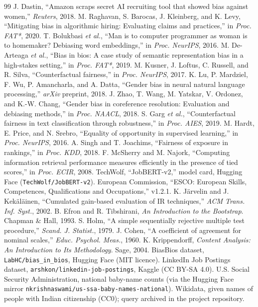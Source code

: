 \documentclass[conference,a4paper]{IEEEtran}
\begin{document}
\begin{thebibliography}{99}
 J. Dastin, ``Amazon scraps secret AI recruiting tool that showed bias against women,'' \emph{Reuters}, 2018.
 M. Raghavan, S. Barocas, J. Kleinberg, and K. Levy, ``Mitigating bias in algorithmic hiring: Evaluating claims and practices,'' in \emph{Proc. FAT*}, 2020.
 T. Bolukbasi \emph{et al.}, ``Man is to computer programmer as woman is to homemaker? Debiasing word embeddings,'' in \emph{Proc. NeurIPS}, 2016.
 M. De-Arteaga \emph{et al.}, ``Bias in bios: A case study of semantic representation bias in a high-stakes setting,'' in \emph{Proc. FAT*}, 2019.
 M. Kusner, J. Loftus, C. Russell, and R. Silva, ``Counterfactual fairness,'' in \emph{Proc. NeurIPS}, 2017.
 K. Lu, P. Mardziel, F. Wu, P. Amancharla, and A. Datta, ``Gender bias in neural natural language processing,'' \emph{arXiv} preprint, 2018.
 J. Zhao, T. Wang, M. Yatskar, V. Ordonez, and K.-W. Chang, ``Gender bias in coreference resolution: Evaluation and debiasing methods,'' in \emph{Proc. NAACL}, 2018.
 S. Garg \emph{et al.}, ``Counterfactual fairness in text classification through robustness,'' in \emph{Proc. AIES}, 2019.
 M. Hardt, E. Price, and N. Srebro, ``Equality of opportunity in supervised learning,'' in \emph{Proc. NeurIPS}, 2016.
 A. Singh and T. Joachims, ``Fairness of exposure in rankings,'' in \emph{Proc. KDD}, 2018.
 F. McSherry and M. Najork, ``Computing information retrieval performance measures efficiently in the presence of tied scores,'' in \emph{Proc. ECIR}, 2008.
 TechWolf, ``JobBERT-v2,'' model card, Hugging Face (\texttt{TechWolf/\allowbreak{}JobBERT-\allowbreak{}v2}).
 European Commission, ``ESCO: European Skills, Competences, Qualifications and Occupations,'' v1.2.1.
 K. Järvelin and J. Kekäläinen, ``Cumulated gain-based evaluation of IR techniques,'' \emph{ACM Trans. Inf. Syst.}, 2002.
 B. Efron and R. Tibshirani, \emph{An Introduction to the Bootstrap}. Chapman \& Hall, 1993.
 S. Holm, ``A simple sequentially rejective multiple test procedure,'' \emph{Scand. J. Statist.}, 1979.
 J. Cohen, ``A coefficient of agreement for nominal scales,'' \emph{Educ. Psychol. Meas.}, 1960.
 K. Krippendorff, \emph{Content Analysis: An Introduction to Its Methodology}. Sage, 2004.
 BiasBios dataset, \texttt{LabHC/\allowbreak{}bias\_\allowbreak{}in\_\allowbreak{}bios}, Hugging Face (MIT licence).
 LinkedIn Job Postings dataset, \texttt{arshkon/\allowbreak{}linkedin-\allowbreak{}job-\allowbreak{}postings}, Kaggle (CC BY-SA 4.0).
 U.S. Social Security Administration, national baby-name counts (via the Hugging Face mirror \texttt{nkrishnaswami/\allowbreak{}us-\allowbreak{}ssa-\allowbreak{}baby-\allowbreak{}names-\allowbreak{}national}).
 Wikidata, given names of people with Indian citizenship (CC0); query archived in the project repository.
\end{thebibliography}
\end{document}
